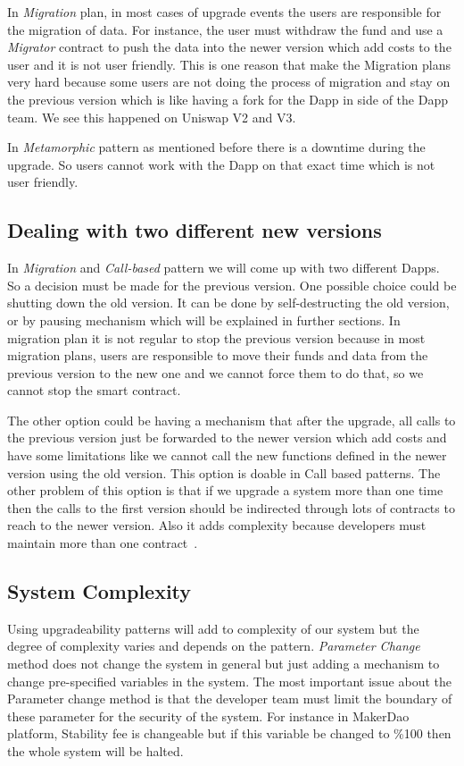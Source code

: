 In \textit{Migration} plan, in most cases of upgrade events the users are responsible for the migration of data. For instance, the user must withdraw the fund and use a \textit{Migrator} contract to push the data into the newer version which add costs to the user and it is not user friendly. This is one reason that make the Migration plans very hard because some users are not doing the process of migration and stay on the previous version which is like having a fork for the Dapp in side of the Dapp team. We see this happened on Uniswap V2 and V3.

In \textit{Metamorphic} pattern as mentioned before there is a downtime during the upgrade. So users cannot work with the Dapp on that exact time which is not user friendly.

\subsection{Dealing with two different new versions}
In \textit{Migration} and \textit{Call-based} pattern we will come up with two different Dapps. So a decision must be made for the previous version. One possible choice could be shutting down the old version. It can be done by self-destructing the old version, or by pausing mechanism which will be explained in further sections. In migration plan it is not regular to stop the previous version because in most migration plans, users are responsible to move their funds and data from the previous version to the new one and we cannot force them to do that, so we cannot stop the smart contract. 

The other option could be having a mechanism that after the upgrade, all calls to the previous version just be forwarded to the newer version which add costs and have some limitations like we cannot call the new functions defined in the newer version using the old version. This option is doable in Call based patterns. The other problem of this option is that if we upgrade a system more than one time then the calls to the first version should be indirected through lots of contracts to reach to the newer version. Also it adds complexity because developers must maintain more than one contract~\cite{ToBantiPattern}.


 \subsection{System Complexity} \label{sysComplexity}

 Using upgradeability patterns will add to complexity of our system but the degree of complexity varies and depends on the pattern. 
\textit{Parameter Change} method does not change the system in general but just adding a mechanism to change pre-specified variables in the system. The most important issue about the Parameter change method is that the developer team must limit the boundary of these parameter for the security of the system. For instance in MakerDao platform, Stability fee is changeable but if this variable be changed to \%100 then the whole system will be halted.

